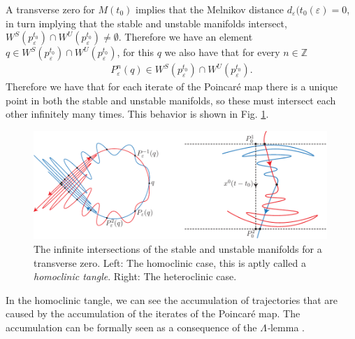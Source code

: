 A transverse zero for $M(t_0)$ implies that the Melnikov distance $d_{\varepsilon }(t_{0}(\varepsilon)=0$, in turn implying that the stable and unstable manifolds intersect, $W^{S}(p_{\varepsilon}^{t_0}) \cap W^{U}(p_{\varepsilon}^{t_0}) \neq \emptyset$. Therefore we have an element $q\in W^{S}(p_{\varepsilon}^{t_0}) \cap W^{U}(p_{\varepsilon}^{t_0})$, for this $q$ we also have that for every $n \in \mathbb{Z}$
\begin{align}
	P_{\varepsilon}^{n}(q) \in W^{S}(p_{\varepsilon}^{t_0}) \cap W^{U}(p_{\varepsilon}^{t_0}). 
\end{align}
Therefore we have that for each iterate of the Poincaré map there is a unique point in both the stable and unstable manifolds, so these must intersect each other infinitely many times. This behavior is shown in Fig. \ref{fig:inf_intersections}. 
\begin{figure}[h!]
	\centering
	\includegraphics[width=0.99\textwidth]{figures/ch6/11inf_intersection.pdf}
	\caption{The infinite intersections of the stable and unstable manifolds for a transverse zero. Left: The homoclinic case, this is aptly called a \emph{homoclinic tangle}. Right: The heteroclinic case.}
	\label{fig:inf_intersections}
\end{figure}
In the homoclinic tangle, we can see the accumulation of trajectories that are caused by the accumulation of the iterates of the Poincaré map. The accumulation can be formally seen as a consequence of the $\Lambda${\emph-lemma} \cite{PalisPhd, Palis}.

